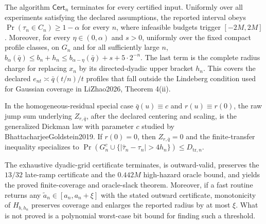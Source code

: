 The algorithm \(\mathsf{Cert}_n\) terminates for every certified input. Uniformly over all experiments satisfying the declared assumptions, the reported interval obeys \(\Pr(\tau_n\in C_n)\ge1-\alpha\) for every \(n\), where infeasible budgets trigger \([-2M,2M]\). Moreover, for every \(\eta\in(0,\alpha)\) and \(s>0\), uniformly over the fixed compact profile classes, on \(G_n\) and for all sufficiently large \(n\), \(b_{\alpha}(\bar q)\le b_n+h_n\le b_{\alpha-\eta}(\bar q)+s+5\cdot2^{-n}\). The last term is the complete radius charge for replacing \(x_n\) by its directed-dyadic upper bracket \(h_n\). This covers the declared \(e_{nt}\asymp\bar q(t/n)/t\) profiles that fall outside the Lindeberg condition used for Gaussian coverage in LiZhao2026, Theorem 4(ii).

In the homogeneous-residual special case \(\bar q(u)\equiv c\) and \(r(u)\equiv r(0)\), the raw jump sum underlying \(Z_{r,\bar q}\), after the declared centering and scaling, is the generalized Dickman law with parameter \(c\) studied by BhattacharjeeGoldstein2019. If \(r(0)=0\), then \(Z_{r,\bar q}=0\) and the finite-transfer inequality specializes to \(\Pr(G_n^c\cup\{|\widehat\tau_n-\tau_n|>4h_n\})\le D_{\mathrm{tr},n}\).

The exhaustive dyadic-grid certificate terminates, is outward-valid, preserves the \(13/32\) late-ramp certificate and the \(0.442M\) high-hazard oracle bound, and yields the proved finite-coverage and oracle-slack theorem.  Moreover, if a fast routine returns any \(\widetilde a_n\in[a_n,a_n+\xi]\) with the stated outward certificate, monotonicity of \(H_{b,h_n}\) preserves coverage and enlarges the reported radius by at most \(\xi\).  What is not proved is a polynomial worst-case bit bound for finding such a threshold.
